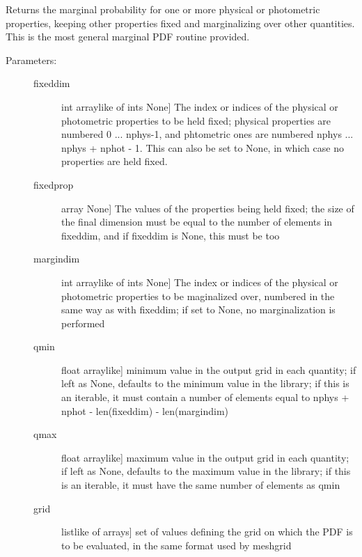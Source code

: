 \documentclass[letterpaper,10pt,english]{sphinxmanual}
\begin{document}
\begin{fulllineitems}
\begin{fulllineitems}
\label{cluster_slug:slugpy.cluster_slug.cluster_slug.mpdf_gen}
Returns the marginal probability for one or more physical or
photometric properties, keeping other properties fixed and
marginalizing over other quantities. This is the most general
marginal PDF routine provided.
\begin{description}
\item[{Parameters:}] \leavevmode\begin{description}
\item[{fixeddim}] \leavevmode{[}int \textbar{} arraylike of ints \textbar{} None{]}
The index or indices of the physical or photometric
properties to be held fixed; physical properties are
numbered 0 ... nphys-1, and phtometric ones are numbered
nphys ... nphys + nphot - 1. This can also be set to
None, in which case no properties are held fixed.

\item[{fixedprop}] \leavevmode{[}array \textbar{} None{]}
The values of the properties being held fixed; the size
of the final dimension must be equal to the number of
elements in fixeddim, and if fixeddim is None, this must
be too

\item[{margindim}] \leavevmode{[}int \textbar{} arraylike of ints \textbar{} None{]}
The index or indices of the physical or photometric
properties to be maginalized over, numbered in the same
way as with fixeddim; if set to None, no marginalization
is performed

\item[{qmin}] \leavevmode{[}float \textbar{} arraylike{]}
minimum value in the output grid in each quantity; if
left as None, defaults to the minimum value in the
library; if this is an iterable, it must contain a
number of elements equal to nphys + nphot -
len(fixeddim) - len(margindim)

\item[{qmax}] \leavevmode{[}float \textbar{} arraylike{]}
maximum value in the output grid in each quantity; if
left as None, defaults to the maximum value in the
library; if this is an iterable, it must have the same
number of elements as qmin

\item[{grid}] \leavevmode{[}listlike of arrays{]}
set of values defining the grid on which the PDF is to
be evaluated, in the same format used by meshgrid


\end{description}
\end{description}
\end{fulllineitems}
\end{fulllineitems}
\end{document}
